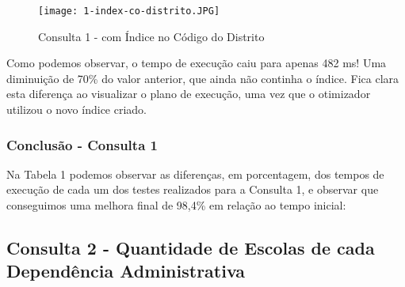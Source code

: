\documentclass[12pt,a4paper]{article}
\begin{document}
\begin{figure}[H]
    \centering
    \texttt{[image: 1-index-co-distrito.JPG]}
    \caption{Consulta 1 - com Índice no Código do Distrito}
    \label{fig:diagrama}
\end{figure}

Como podemos observar, o tempo de execução caiu para apenas 482 ms! Uma diminuição de 70\% do valor anterior, que ainda não continha o índice. Fica clara esta diferença ao visualizar o plano de execução, uma vez que o otimizador utilizou o novo índice criado.


\subsubsection{Conclusão - Consulta 1}
\vspace{0.5cm}
Na Tabela 1 podemos observar as diferenças, em porcentagem, dos tempos de execução de cada um dos testes realizados para a Consulta 1, e observar que conseguimos uma melhora final de 98,4\% em relação ao tempo inicial:

\begin{table}[htbp]
  \centering
  \caption{Comparação Consulta 1}
  \label{tab:compconsulta1}%
\end{table}%


\subsection{Consulta 2 - Quantidade de Escolas de cada Dependência Administrativa}
\end{document}
